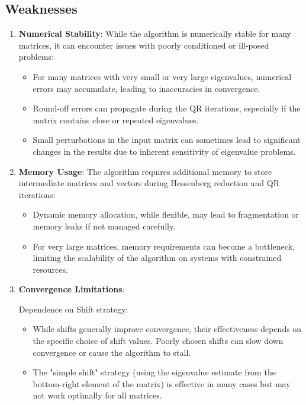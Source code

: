 \documentclass{article}
\begin{document}
\subsection{ Weaknesses}
\begin{enumerate}
    \item \textbf{Numerical Stability}: While the algorithm is numerically stable for many matrices, it can encounter issues with poorly conditioned or ill-posed problems:
    \begin{itemize}
        \item For many matrices with very small or very large eigenvalues, numerical errors may accumulate, leading to inaccuracies in convergence.
        \item Round-off errors can propagate during the QR iterations, especially if the matrix contains close or repeated eigenvalues.
        \item Small perturbations in the input matrix can sometimes lead to significant changes in the results due to inherent sensitivity of eigenvalue problems.
    \end{itemize}

    \item \textbf{Memory Usage}: The algorithm requires additional memory to store intermediate matrices and vectors during Hessenberg reduction and QR iterations:
    \begin{itemize}
        \item Dynamic memory allocation, while flexible, may lead to fragmentation or memory leaks if not managed carefully.
        \item For very large matrices, memory requirements can become a bottleneck, limiting the scalability of the algorithm on systems with constrained resources.
    \end{itemize}

    \item \textbf{Convergence Limitations}: 

    Dependence on Shift strategy:
    \begin{itemize}
        \item While shifts generally improve convergence, their effectiveness depends on the specific choice of shift values. Poorly chosen shifts can slow down convergence or cause the algorithm to stall.
        \item The "simple shift" strategy (using the eigenvalue estimate from the bottom-right element of the matrix) is effective in many cases but may not work optimally for all matrices.
    \end{itemize}


\end{enumerate}
\end{document}
